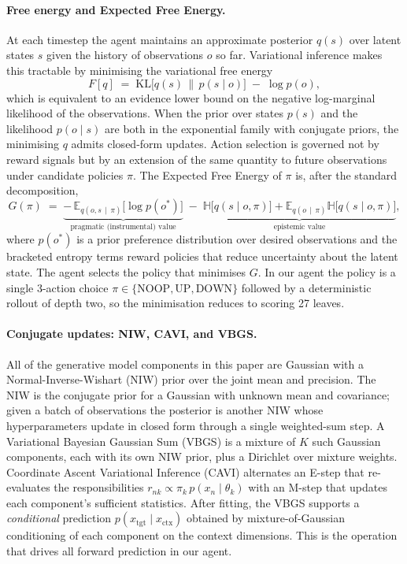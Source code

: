 \documentclass[runningheads]{llncs}
\begin{document}
\paragraph{Free energy and Expected Free Energy.}
At each timestep the agent maintains an approximate posterior $q(s)$
over latent states $s$ given the history of observations $o$ so far.
Variational inference makes this tractable by minimising the
variational free energy
\begin{equation}
  F[q] \;=\; \mathrm{KL}\!\bigl[q(s)\,\|\,p(s\mid o)\bigr] \;-\;
  \log p(o),
\end{equation}
which is equivalent to an evidence lower bound on the negative
log-marginal likelihood of the observations. When the prior over
states $p(s)$ and the likelihood $p(o\mid s)$ are both in the
exponential family with conjugate priors, the minimising $q$ admits
closed-form updates. Action selection is governed not by reward
signals but by an extension of the same quantity to future
observations under candidate policies $\pi$. The Expected Free
Energy of $\pi$ is, after the standard decomposition,
\begin{equation}
  G(\pi) \;=\; \underbrace{-\,\mathbb{E}_{q(o, s\,\mid\,\pi)}\bigl[\log p(o^*)\bigr]}_{\text{pragmatic (instrumental) value}}
  \;-\;\underbrace{\mathbb{H}\!\bigl[q(s\mid o,\pi)\bigr]
  +\mathbb{E}_{q(o\,\mid\,\pi)}\mathbb{H}\!\bigl[q(s\mid o,\pi)\bigr]}_{\text{epistemic value}},
\end{equation}
where $p(o^*)$ is a prior preference distribution over desired
observations and the bracketed entropy terms reward policies that
reduce uncertainty about the latent state. The agent selects the
policy that minimises $G$. In our agent the policy is a single
3-action choice $\pi\in\{\text{NOOP},\text{UP},\text{DOWN}\}$
followed by a deterministic rollout of depth two, so the
minimisation reduces to scoring 27 leaves.

\paragraph{Conjugate updates: NIW, CAVI, and VBGS.}
All of the generative model components in this paper are Gaussian
with a Normal-Inverse-Wishart (NIW) prior over the joint mean and
precision. The NIW is the conjugate prior for a Gaussian with
unknown mean and covariance; given a batch of observations the
posterior is another NIW whose hyperparameters update in closed form
through a single weighted-sum step. A Variational Bayesian Gaussian
Sum (VBGS) is a mixture of $K$ such Gaussian components, each with
its own NIW prior, plus a Dirichlet over mixture weights. Coordinate
Ascent Variational Inference (CAVI) alternates an E-step that
re-evaluates the responsibilities $r_{nk}\propto\pi_k\,
p(x_n\mid\theta_k)$ with an M-step that updates each component's
sufficient statistics. After fitting, the VBGS supports a
\emph{conditional} prediction $p(x_{\text{tgt}}\mid
x_{\text{ctx}})$ obtained by mixture-of-Gaussian conditioning of
each component on the context dimensions. This is the operation
that drives all forward prediction in our agent.
\end{document}
